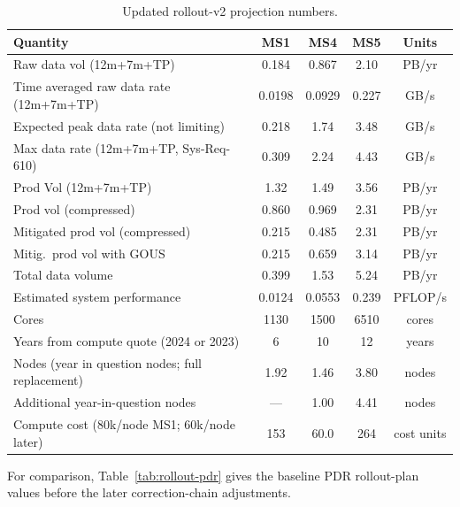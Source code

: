 \documentclass[11pt]{article}
\begin{document}
\begin{table}[p]
\centering
\caption{Updated rollout-v2 projection numbers.}
\label{tab:rollout-main}
\small
\setlength{\tabcolsep}{4pt}
\begin{tabular}{>{\raggedright\arraybackslash}p{2.9in}cccc}
\toprule
Quantity & MS1 & MS4 & MS5 & Units \\
\midrule
Raw data vol (12m+7m+TP) & 0.184 & 0.867 & 2.10 & PB/yr \\
Time averaged raw data rate (12m+7m+TP) & 0.0198 & 0.0929 & 0.227 & GB/s \\
Expected peak data rate (not limiting) & 0.218 & 1.74 & 3.48 & GB/s \\
Max data rate (12m+7m+TP, Sys-Req-610) & 0.309 & 2.24 & 4.43 & GB/s \\
Prod Vol (12m+7m+TP) & 1.32 & 1.49 & 3.56 & PB/yr \\
Prod vol (compressed) & 0.860 & 0.969 & 2.31 & PB/yr \\
Mitigated prod vol (compressed) & 0.215 & 0.485 & 2.31 & PB/yr \\
Mitig.\ prod vol with GOUS & 0.215 & 0.659 & 3.14 & PB/yr \\
Total data volume & 0.399 & 1.53 & 5.24 & PB/yr \\
Estimated system performance & 0.0124 & 0.0553 & 0.239 & PFLOP/s \\
Cores & 1130 & 1500 & 6510 & cores \\
Years from compute quote (2024 or 2023) & 6 & 10 & 12 & years \\
Nodes (year in question nodes; full replacement) & 1.92 & 1.46 & 3.80 & nodes \\
Additional year-in-question nodes & --- & 1.00 & 4.41 & nodes \\
Compute cost (80k/node MS1; 60k/node later) & 153 & 60.0 & 264 & cost units \\
\bottomrule
\end{tabular}
\end{table}

For comparison, Table~\ref{tab:rollout-pdr} gives the baseline PDR rollout-plan
values before the later correction-chain adjustments.
\end{document}
